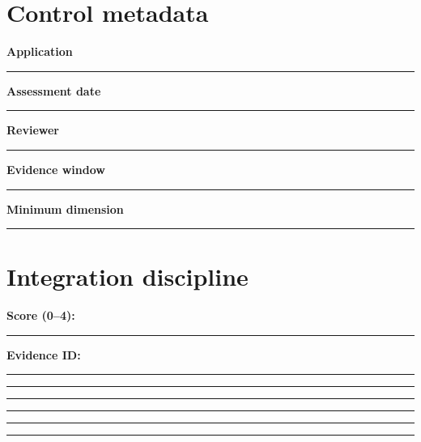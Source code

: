\documentclass[11pt,letterpaper]{article}
\begin{document}
\makedoctitle\makedocsummary
\section{Control metadata}
\noindent\textbf{Application}\par\nobreak\vspace{6pt}\noindent\rule{0.93\linewidth}{0.4pt}\par\vspace{14pt}
\noindent\textbf{Assessment date}\par\nobreak\vspace{6pt}\noindent\rule{0.93\linewidth}{0.4pt}\par\vspace{14pt}
\noindent\textbf{Reviewer}\par\nobreak\vspace{6pt}\noindent\rule{0.93\linewidth}{0.4pt}\par\vspace{14pt}
\noindent\textbf{Evidence window}\par\nobreak\vspace{6pt}\noindent\rule{0.93\linewidth}{0.4pt}\par\vspace{14pt}
\noindent\textbf{Minimum dimension}\par\nobreak\vspace{6pt}\noindent\rule{0.93\linewidth}{0.4pt}\par\vspace{14pt}
\section{Integration discipline}
\noindent\textbf{Score (0--4):}\hspace{1.5cm}\rule{2cm}{0.4pt}\quad\textbf{Evidence ID:}\rule{4cm}{0.4pt}

\vspace{2mm}
\noindent\rule{0.93\linewidth}{0.4pt}\par\vspace{13pt}
\noindent\rule{0.93\linewidth}{0.4pt}\par\vspace{13pt}
\noindent\rule{0.93\linewidth}{0.4pt}\par\vspace{13pt}
\noindent\rule{0.93\linewidth}{0.4pt}\par\vspace{13pt}
\noindent\rule{0.93\linewidth}{0.4pt}\par\vspace{13pt}
\end{document}
